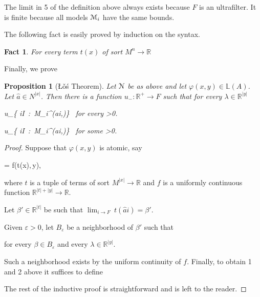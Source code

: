 \documentclass[12pt,letterpaper,oneside,reqno]{amsart}
\theoremstyle{plain}
\newtheorem{proposition}[theorem]{Proposition}
\newtheorem{fact}[theorem]{Fact}
\theoremstyle{remark}
\begin{document}
The limit in 5 of the definition above always exists because $F$ is an ultrafilter.
It is finite because all models ${\EuScript M}_i$ have the same bounds.

The following fact is easily proved by induction on the syntax.

\begin{fact}
  For every term $t(x)$ of sort $ M^n\to\mathds{R}$  
  
  \hfill\qedsymbol
\end{fact}

Finally, we prove 

\begin{proposition}[\L\v{o}\'s Theorem]\label{thm_Los}
  Let ${\EuScript N}$ be as above and let $\varphi(x,y)\in\mathds{L}(A)$.
  Let $\hat a\in N^{|x|}$.
  Then there is a function $u_{-}:\mathds{R}^+\to F$ such that for every $\lambda\in\mathds{R}^{|y|}$

  {\Rightarrow}
  {u_\varepsilon\subseteq\big\{ i\in I\ :\ {\EuScript M}_i\models{}^{\varepsilon\kern-2pt}\varphi(\hat ai,\lambda)\big\} \ \textrm{for every }\varepsilon>0.}

  {\Rightarrow}
  {u_\varepsilon\subseteq\big\{ i\in I\ :\ {\EuScript M}_i\not\models{}^{\varepsilon\kern-2pt}\varphi(\hat ai,\lambda)\big\} \ \textrm{for some }\varepsilon>0.}

\end{proposition}
\begin{proof}
  Suppose that $\varphi(x,y)$ is atomic, say

  {=}
  {f(t(x),\,y),} 
  
  where $t$ is a tuple of terms of sort  $ M^{|x|}\to\mathds{R}$ and $f$ is a uniformly continuous function $\mathds{R}^{|t|+|y|}\to\mathds{R}$. 


  Let $\beta'\in\mathds{R}^{|t|}$ be such that
  $\displaystyle\lim_{i\to F}\ t(\hat ai)=\beta'$.

  Given $\varepsilon>0$, let $B_\varepsilon$ be a neighborhood of $\beta'$ such that 
  
  \hfill for every $\beta\in B_\varepsilon$ and every $\lambda\in\mathds{R}^{|y|}$.
  
  Such a neighborhood exists by the uniform continuity of $f$.
  Finally, to obtain 1 and 2 above it suffices to define 


  The rest of the inductive proof is straightforward and is left to the reader.
\end{proof}
\end{document}
